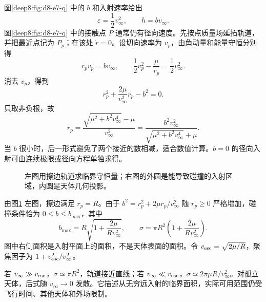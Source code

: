 \begin{solution}
图\ref{deep8:fig:d8-e7-q} 中的 $b$ 和入射速率给出
\[
 \varepsilon=\frac12v_\infty^2,\qquad h=bv_\infty.
\]
图\ref{deep8:fig:d8-e7-q} 中的接触点 $P$ 通常仍有径向速度。先按点质量场延拓轨道，并把最近点记为 $P_p$；在该处 $\dot r=0$。设切向速率为 $v_p$，由角动量和能量守恒分别得
\[
 r_pv_p=bv_\infty,\qquad
 \frac12v_p^2-\frac\mu{r_p}=\frac12v_\infty^2.
\]
消去 $v_p$，得到
\[
 r_p^2+\frac{2\mu}{v_\infty^2}r_p-b^2=0.
\]
只取非负根，故
\begin{equation}
 \boxed{r_p=\frac{\sqrt{\mu^2+b^2v_\infty^4}-\mu}{v_\infty^2}}
 =\frac{b^2v_\infty^2}{\sqrt{\mu^2+b^2v_\infty^4}+\mu}.
\end{equation}
当 $b$ 很小时，后一形式避免了两个接近的数相减，适合数值计算。$b=0$ 的径向入射可由连续极限或径向方程单独求得。
\begin{figure}[H]\centering
{}
\caption{左图用擦边轨道求临界守恒量；右图的外圆是能导致碰撞的入射区域，内圆是天体几何投影。}\label{deep8:fig:d8-e7-s}
\end{figure}
由图\ref{deep8:fig:d8-e7-s} 左图，擦边满足 $r_p=R$。由于 $b^2=r_p^2+2\mu r_p/v_\infty^2$ 随 $r_p\ge0$ 严格增加，碰撞条件恰为 $0\le b\le b_{\max}$，其中
\[
 b_{\max}=R\sqrt{1+\frac{2\mu}{Rv_\infty^2}},\qquad
 \boxed{\sigma=\pi R^2\left(1+\frac{2\mu}{Rv_\infty^2}\right)}.
\]
图中右侧面积是入射平面上的面积，不是天体表面的面积。令 $v_{\rm esc}=\sqrt{2\mu/R}$，聚焦因子为 $1+v_{\rm esc}^2/v_\infty^2$。

若 $v_\infty\gg v_{\rm esc}$，$\sigma\simeq\pi R^2$，轨道接近直线；若 $v_\infty\ll v_{\rm esc}$，$\sigma\simeq2\pi\mu R/v_\infty^2$。对孤立天体，后式随 $v_\infty\to0$ 发散。它描述从无穷远入射的临界面积，实际可用范围仍受飞行时间、其他天体和外场限制。
\end{solution}



